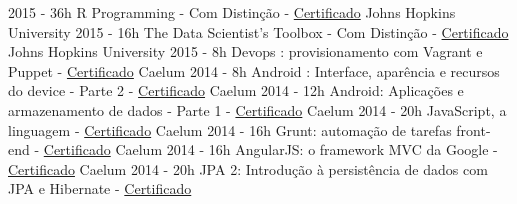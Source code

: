 \begin{entrylistii}
  \entryii
    {2015 - 36h}
    {R Programming - Com Distinção - \href{https://www.coursera.org/account/accomplishments/records/p3u7HG52CSE2qRGP}{Certificado}}
    {Johns Hopkins University}
  \entryii
    {2015 - 16h}
    {The Data Scientist’s Toolbox - Com Distinção - \href{https://www.coursera.org/account/accomplishments/records/EqAPAr2dEYeBbBSB}{Certificado}}
    {Johns Hopkins University}
  \entryii
    {2015 - 8h}
    {Devops : provisionamento com Vagrant e Puppet - \href{https://www.alura.com.br/user/3311/fullCertificate/bdd8817990ef209f0fb6b049f2d2ea0c}{Certificado}}
    {Caelum}
  \entryii
    {2014 - 8h}
    {Android : Interface, aparência e recursos do device - Parte 2 - \href{https://www.alura.com.br/user/3311/fullCertificate/bdd8817990ef209f0fb6b049f2d2ea0c}{Certificado}}
    {Caelum}
  \entryii
    {2014 - 12h}
    {Android: Aplicações e armazenamento de dados - Parte 1 - \href{https://www.alura.com.br/user/3311/fullCertificate/bdd8817990ef209f0fb6b049f2d2ea0c}{Certificado}}
    {Caelum}    
  \entryii
    {2014 - 20h}
    {JavaScript, a linguagem - \href{https://www.alura.com.br/user/3311/fullCertificate/bdd8817990ef209f0fb6b049f2d2ea0c}{Certificado}}
    {Caelum}
  \entryii
    {2014 - 16h}
    {Grunt: automação de tarefas front-end - \href{https://www.alura.com.br/user/3311/fullCertificate/bdd8817990ef209f0fb6b049f2d2ea0c}{Certificado}}
    {Caelum}  
  \entryii
    {2014 - 16h}
    {AngularJS: o framework MVC da Google - \href{https://www.alura.com.br/user/3311/fullCertificate/bdd8817990ef209f0fb6b049f2d2ea0c}{Certificado}}
    {Caelum}
  \entryii
    {2014 - 20h}
    {JPA 2: Introdução à persistência de dados com JPA e Hibernate - \href{https://www.alura.com.br/user/3311/fullCertificate/bdd8817990ef209f0fb6b049f2d2ea0c}{Certificado}}

\end{entrylistii}
